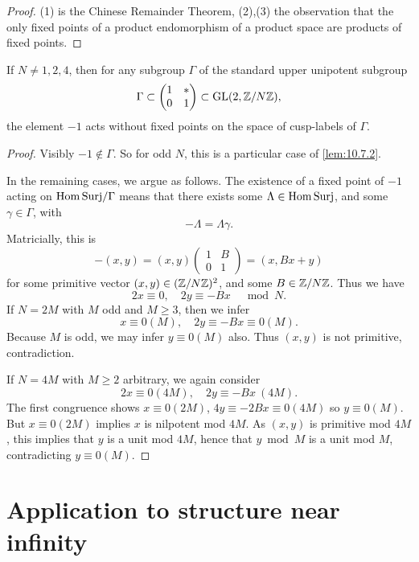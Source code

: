 \begin{proof}
(1) is the Chinese Remainder Theorem, (2),(3) the observation that the only fixed points of a product endomorphism of a product space are products of fixed points.
\end{proof}

\begin{klem}\label{lem:10.7.4}
If $N \ne 1,2,4$, then for any subgroup $\Gamma$ of the standard upper unipotent subgroup
\[
\Gamma \subset \begin{pmatrix} 1 & * \\ 0 & 1 \end{pmatrix} \subset \operatorname{GL}(2,\mathbb{Z}/N\mathbb{Z}) ,
\]
the element $-1$ acts without fixed points on the space of cusp-labels of $\Gamma$.
\end{klem}

\begin{proof}
Visibly $-1 \notin \Gamma$. So for odd $N$, this is a particular case of \eqref{lem:10.7.2}.

In the remaining cases, we argue as follows. The existence of a fixed point of $-1$ acting on $\mathrm{Hom\,Surj}/\Gamma$ means that there exists some $\Lambda \in \mathrm{Hom\,Surj}$, and some $\gamma \in \Gamma$, with
\[
-\Lambda = \Lambda \gamma .
\]
Matricially, this is
\[
-(x,y) = (x,y)\begin{pmatrix} 1 & B \\ 0 & 1 \end{pmatrix} = (x, Bx+y)
\]
for some primitive vector $(x,y) \in (\mathbb{Z}/N\mathbb{Z})^2$, and some $B \in \mathbb{Z}/N\mathbb{Z}$. Thus we have
\[
2x \equiv 0 , \quad 2y \equiv -Bx \quad \bmod N .
\]
If $N = 2M$ with $M$ odd and $M \ge 3$, then we infer
\[
x \equiv 0(M), \quad 2y \equiv -Bx \equiv 0(M) .
\]
Because $M$ is odd, we may infer $y \equiv 0(M)$ also. Thus $(x,y)$ is not primitive, contradiction.

If $N = 4M$ with $M \ge 2$ arbitrary, we again consider
\[
2x \equiv 0(4M), \quad 2y \equiv -Bx \ (4M) .
\]
The first congruence shows $x \equiv 0(2M)$, $4y \equiv -2Bx \equiv 0(4M)$ so $y \equiv 0(M)$. But $x \equiv 0(2M)$ implies $x$ is nilpotent mod $4M$. As $(x,y)$ is primitive mod $4M$, this implies that $y$ is a unit mod $4M$, hence that $y \bmod M$ is a unit mod $M$, contradicting $y \equiv 0(M)$.
\end{proof}


\section{Application to structure near infinity}
\label{sec:10.8}

